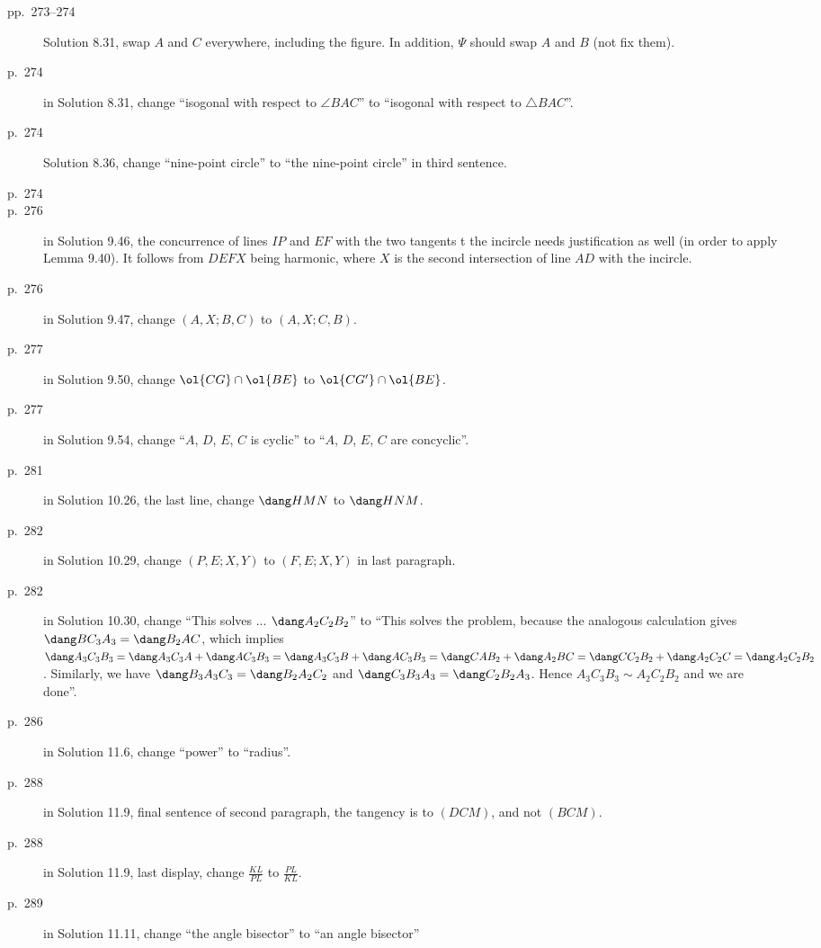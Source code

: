 \documentclass[11pt]{scrartcl}
\begin{document}
\begin{description}
\item[pp.\ 273--274] Solution 8.31, swap $A$ and $C$ everywhere, including the figure.
  In addition, $\Psi$ should swap $A$ and $B$ (not fix them).
\item[p.\  274] in Solution 8.31, change ``isogonal with respect to $\angle{BAC}$''
  to ``isogonal with respect to $\triangle{BAC}$''.
\item[p.\  274] Solution 8.36, change ``nine-point circle''
  to ``the nine-point circle'' in third sentence.
\item[p.\  274] 
\item[p.\  276] in Solution 9.46, the concurrence of lines $IP$ and $EF$
  with the two tangents t the incircle needs justification as well
  (in order to apply Lemma 9.40). It follows from $DEFX$ being harmonic,
  where $X$ is the second intersection of line $AD$ with the incircle.
\item[p.\  276] in Solution 9.47, change $(A,X;B,C)$ to $(A,X;C,B)$.
\item[p.\  277] in Solution 9.50, change $\ol{CG} \cap \ol{BE}$ to $\ol{CG'} \cap \ol{BE}$.
\item[p.\  277] in Solution 9.54, change ``$A$, $D$, $E$, $C$ is cyclic'' to ``$A$, $D$, $E$, $C$ are concyclic''.
\item[p.\  281] in Solution 10.26, the last line, change $\dang HMN$ to $\dang HNM$.
\item[p.\  282] in Solution 10.29, change $(P,E;X,Y)$ to $(F,E;X,Y)$ in last paragraph.
\item[p.\  282] in Solution 10.30, change ``This solves ... $\dang A_2C_2B_2$'' to
  ``This solves the problem, because the analogous calculation gives $\dang BC_3A_3 = \dang B_2AC$,
  which implies $\dang A_3C_3B_3 = \dang A_3C_3A + \dang AC_3B_3 = \dang A_3C_3B + \dang AC_3B_3
  = \dang CAB_2 + \dang A_2BC = \dang CC_2B_2 + \dang A_2C_2C = \dang A_2C_2B_2$.
  Similarly, we have $\dang B_3A_3C_3 = \dang B_2A_2C_2$ and $\dang C_3B_3A_3 = \dang C_2B_2A_3$.
  Hence $A_3C_3B_3 \sim A_2C_2B_2$ and we are done''.
\item[p.\  286] in Solution 11.6, change ``power'' to ``radius''.
\item[p.\  288] in Solution 11.9, final sentence of second paragraph,
  the tangency is to $(DCM)$, and not $(BCM)$.
\item[p.\  288] in Solution 11.9, last display, change $\frac{KL}{PL}$ to $\frac{PL}{KL}$.
\item[p.\  289] in Solution 11.11, change ``the angle bisector'' to ``an angle bisector''

\end{description}
\end{document}
